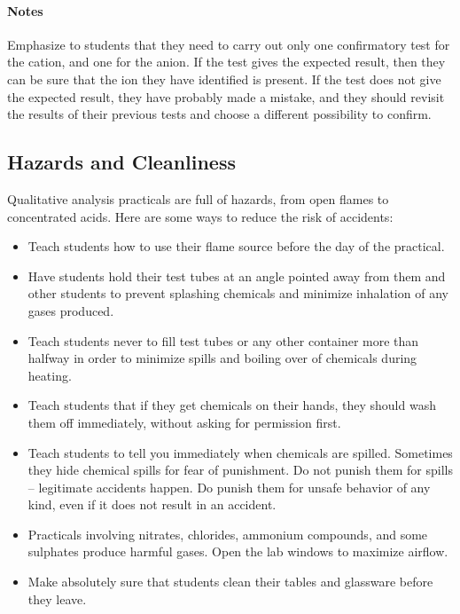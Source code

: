 \setcounter{secnumdepth}{2}
\paragraph{Notes}

Emphasize to students that they need to carry out only one confirmatory test for the cation, 
and one for the anion. If the test gives the expected result, then they can be sure that the ion they have identified is present. If the test does not give the expected result, they have probably made a mistake, and they should revisit the results of their previous tests 
and choose a different possibility to confirm.


\subsection{Hazards and Cleanliness}

Qualitative analysis practicals are full of hazards, 
from open flames to concentrated acids. 
Here are some ways to reduce the risk of accidents:

\begin{itemize}
\item Teach students how to use their flame source 
before the day of the practical.


\item Have students hold their test tubes at an angle pointed away from them and other students to prevent splashing chemicals and  minimize inhalation of any gases produced.

\item Teach students never to fill test tubes or any other container more than halfway in order to minimize spills and boiling over of chemicals during heating.

\item Teach students that if they get chemicals on their hands, they should wash them off immediately, without asking for permission first. 

\item Teach students to tell you immediately when chemicals are spilled. 
Sometimes they hide chemical spills for fear of punishment. Do not punish them for spills -- legitimate accidents happen. Do punish them for unsafe behavior of any kind, even if it does not result in an accident. 

\item Practicals involving nitrates, chlorides, ammonium compounds, and some sulphates produce harmful gases. Open the lab windows to maximize airflow.

\item Make absolutely sure that students clean their tables and glassware before they leave.
\end{itemize}

